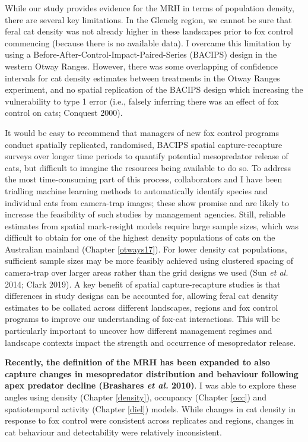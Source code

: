 \documentclass[11pt,a4paper,titlepage,twoside,openright]{style/unimelbthesis}
\begin{document}
\begin{mainmatter}
While our study provides evidence for the MRH in terms of population density, there are several key limitations. In the Glenelg region, we cannot be sure that feral cat density was not already higher in these landscapes prior to fox control commencing (because there is no available data). I overcame this limitation by using a Before-After-Control-Impact-Paired-Series (BACIPS) design in the western Otway Ranges. However, there was some overlapping of confidence intervals for cat density estimates between treatments in the Otway Ranges experiment, and no spatial replication of the BACIPS design which increasing the vulnerability to type 1 error (i.e., falsely inferring there was an effect of fox control on cats; Conquest 2000).

It would be easy to recommend that managers of new fox control programs conduct spatially replicated, randomised, BACIPS spatial capture-recapture surveys over longer time periods to quantify potential mesopredator release of cats, but difficult to imagine the resources being available to do so. To address the most time-consuming part of this process, collaborators and I have been trialling machine learning methods to automatically identify species and individual cats from camera-trap images; these show promise and are likely to increase the feasibility of such studies by management agencies. Still, reliable estimates from spatial mark-resight models require large sample sizes, which was difficult to obtain for one of the highest density populations of cats on the Australian mainland (Chapter \ref{otways17}). For lower density cat populations, sufficient sample sizes may be more feasibly achieved using clustered spacing of camera-trap over larger areas rather than the grid designs we used (Sun \emph{et al.} 2014; Clark 2019). A key benefit of spatial capture-recapture studies is that differences in study designs can be accounted for, allowing feral cat density estimates to be collated across different landscapes, regions and fox control programs to improve our understanding of fox-cat interactions. This will be particularly important to uncover how different management regimes and landscape contexts impact the strength and occurrence of mesopredator release.

\textbf{Recently, the definition of the MRH has been expanded to also capture changes in mesopredator distribution and behaviour following apex predator decline (Brashares \emph{et al.} 2010)}. I was able to explore these angles using density (Chapter \ref{density}), occupancy (Chapter \ref{occ}) and spatiotemporal activity (Chapter \ref{diel}) models. While changes in cat density in response to fox control were consistent across replicates and regions, changes in cat behaviour and detectability were relatively inconsistent.


\end{mainmatter}
\end{document}
